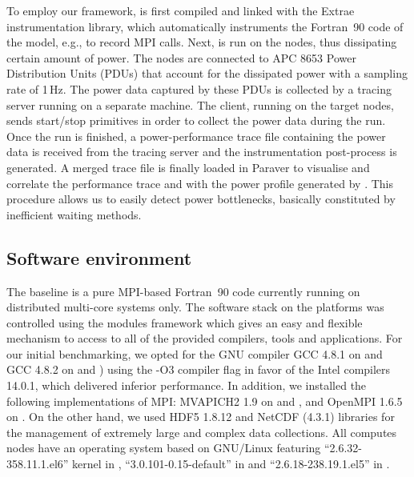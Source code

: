 To employ our  framework, \cosmoart is first compiled  and linked with
the  Extrae instrumentation  library, which  automatically instruments
the Fortran~90  code of the model,  e.g., to record  MPI calls.  Next,
\cosmoart  is run  on the  nodes, thus  dissipating certain  amount of
power. The  nodes are connected  to APC 8653 Power  Distribution Units
(PDUs) that account  for the dissipated power with  a sampling rate of
1\,Hz. The power data captured by  these PDUs is collected by a \pmlib
tracing server running  on a separate machine. The  client, running on
the target nodes, sends start/stop  primitives in order to collect the
power  data during  the \cosmoart  run. Once  the run  is  finished, a
power-performance  trace file  containing the  power data  is received
from  the  tracing  server  and the  instrumentation  post-process  is
generated.  A  merged trace  file  is  finally  loaded in  Paraver  to
visualise  and correlate  the  performance trace  and  with the  power
profile  generated by \cosmoart.  This procedure  allows us  to easily
detect power bottlenecks, basically constituted by inefficient waiting
methods.

\subsection{Software environment}
\label{subsec:3.2}

The \cosmoart  baseline is a pure MPI-based  Fortran~90 code currently
running on distributed multi-core systems only.  The software stack on
the platforms  was controlled using the modules  framework which gives
an  easy and  flexible  mechanism to  access  to all  of the  provided
compilers, tools  and applications.  For our  initial benchmarking, we
opted for the GNU compiler GCC 4.8.1 on \monch and GCC 4.8.2 on \pilat
and  \tinto)  using  the -O3  compiler  flag  in  favor of  the  Intel
compilers 14.0.1, which  delivered inferior performance.  In addition,
we  installed the following  implementations of  MPI: MVAPICH2  1.9 on
\monch and \pilat, and OpenMPI 1.6.5  on \tinto. On the other hand, we
used HDF5  1.8.12 and NetCDF  (4.3.1) libraries for the  management of
extremely large and complex data collections.  All computes nodes have
an     operating    system     based     on    GNU/Linux     featuring
``2.6.32-358.11.1.el6'' kernel  in \monch, ``3.0.101-0.15-default'' in
\pilat and ``2.6.18-238.19.1.el5'' in \tinto.

